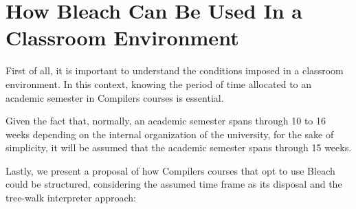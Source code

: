 \section{How Bleach Can Be Used In a Classroom Environment}
First of all, it is important to understand the conditions imposed in a classroom environment. In this context, knowing the period of time allocated to an academic semester in Compilers courses is essential.

Given the fact that, normally, an academic semester spans through 10 to 16 weeks depending on the internal organization of the university, for the sake of simplicity, it will be assumed that the academic semester spans through 15 weeks.

Lastly, we present a proposal of how Compilers courses that opt to use Bleach could be structured, considering the assumed time frame as its disposal and the tree-walk interpreter approach:
